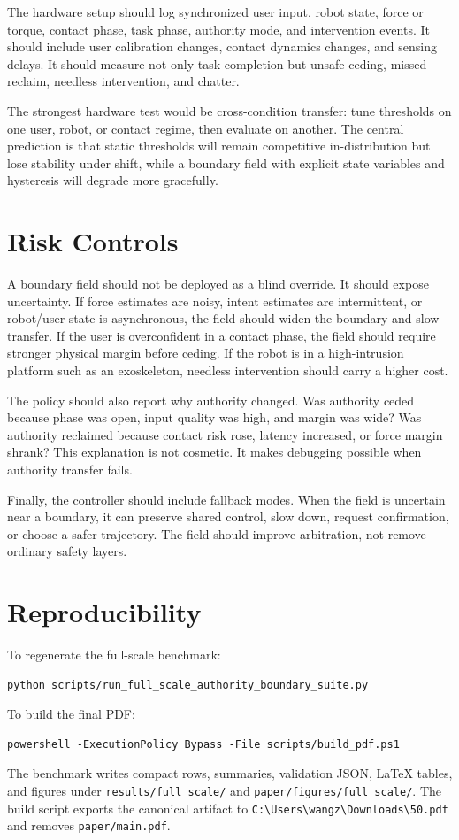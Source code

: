 \documentclass{article}
\begin{document}
The hardware setup should log synchronized user input, robot state, force or torque, contact phase, task phase, authority mode, and intervention events. It should include user calibration changes, contact dynamics changes, and sensing delays. It should measure not only task completion but unsafe ceding, missed reclaim, needless intervention, and chatter.

The strongest hardware test would be cross-condition transfer: tune thresholds on one user, robot, or contact regime, then evaluate on another. The central prediction is that static thresholds will remain competitive in-distribution but lose stability under shift, while a boundary field with explicit state variables and hysteresis will degrade more gracefully.

\clearpage
\section{Risk Controls}

A boundary field should not be deployed as a blind override. It should expose uncertainty. If force estimates are noisy, intent estimates are intermittent, or robot/user state is asynchronous, the field should widen the boundary and slow transfer. If the user is overconfident in a contact phase, the field should require stronger physical margin before ceding. If the robot is in a high-intrusion platform such as an exoskeleton, needless intervention should carry a higher cost.

The policy should also report why authority changed. Was authority ceded because phase was open, input quality was high, and margin was wide? Was authority reclaimed because contact risk rose, latency increased, or force margin shrank? This explanation is not cosmetic. It makes debugging possible when authority transfer fails.

Finally, the controller should include fallback modes. When the field is uncertain near a boundary, it can preserve shared control, slow down, request confirmation, or choose a safer trajectory. The field should improve arbitration, not remove ordinary safety layers.

\clearpage
\section{Reproducibility}

To regenerate the full-scale benchmark:
\begin{verbatim}
python scripts/run_full_scale_authority_boundary_suite.py
\end{verbatim}
To build the final PDF:
\begin{verbatim}
powershell -ExecutionPolicy Bypass -File scripts/build_pdf.ps1
\end{verbatim}
The benchmark writes compact rows, summaries, validation JSON, LaTeX tables, and figures under \texttt{results/full\_scale/} and \texttt{paper/figures/full\_scale/}. The build script exports the canonical artifact to \texttt{C:\textbackslash Users\textbackslash wangz\textbackslash Downloads\textbackslash 50.pdf} and removes \texttt{paper/main.pdf}.
\end{document}
